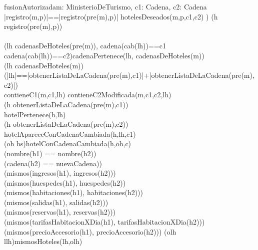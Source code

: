 \begin{problema}{fusionAutorizada}{m: MinisterioDeTurismo, c1: Cadena, c2: Cadena}{}
  {
      \\|registro(m,p)|==|registro(pre(m),p)| \land hotelesDeseados(m,p,c1,c2)  )
  }
  {
      (\forall h \selec registro(pre(m),p))\\
  }
  {
      \\(\forall lh \selec cadenasDeHoteles(pre(m)), \lnot cadena(cab(lh))==c1\\
      \land \lnot cadena(cab(lh))==c2)cadenaPertenece(lh, cadenasDeHoteles(m))
  }
  {
      \\(\exists lh \selec cadenasDeHoteles(m))\\
      (|lh|==|obtenerListaDeLaCadena(pre(m),c1)|+|obtenerListaDeLaCadena(pre(m),c2)|)\\
      \land contieneC1(m,c1,lh) \land contieneC2Modificada(m,c1,c2,lh)
  }
  {
      \\(\forall h \selec obtenerListaDeLaCadena(pre(m),c1))\\
      hotelPertenece(h,lh)
  }
  {
      \\(\forall h \selec obtenerListaDeLaCadena(pre(m),c2))\\
      hotelApareceConCadenaCambiada(h,lh,c1)
  }
  {
    \\(\exists oh \selec hs)hotelConCadenaCambiada(h,oh,c)
  }
  {
	  \\ (nombre(h1) == nombre(h2)) \land \\
	  (cadena(h2) == nuevaCadena)) \land \\
	  (mismos(ingresos(h1), ingresos(h2))) \land \\
	  (mismos(huespedes(h1), huespedes(h2)) \land \\
	  (mismos(habitaciones(h1), habitaciones(h2))) \land \\
	  (mismos(salidas(h1), salidas(h2))) \land \\
	  (mismos(reservas(h1), reservas(h2))) \land \\
	  (mismos(tarifasHabitacionXDia(h1), tarifasHabitacionXDia(h2))) \land \\
	  (mismos(precioAccesorio(h1), precioAccesorio(h2)))
  }
  {
      (\exists olh \selec llh)mismosHoteles(lh,olh)
  }
\end{problema}